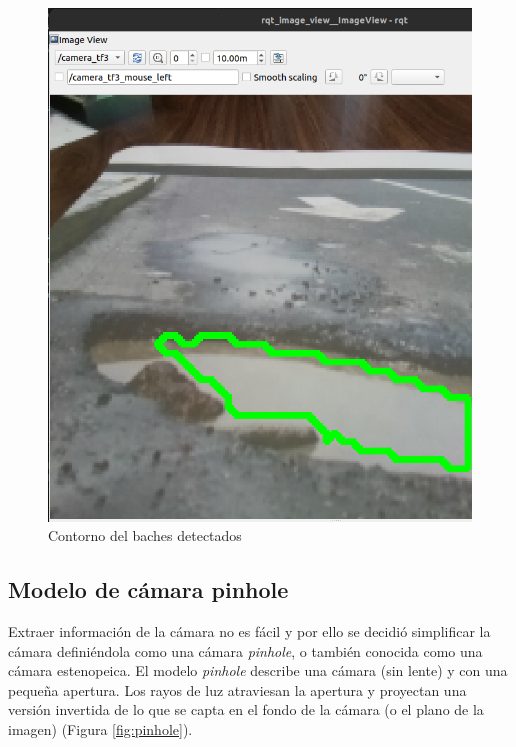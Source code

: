 \begin{figure}[ht!]
\begin{minipage}{0.4\linewidth}
		\includegraphics[width=\linewidth]{figs/cap6/contornobache2.png}
	\end{minipage}
	\caption{Contorno del baches detectados}
	\label{fig:contornobache}
\end{figure}

\subsection{Modelo de cámara pinhole}
\label{subsec:softwarehsuelo}

Extraer información de la cámara no es fácil y por ello se decidió simplificar la cámara definiéndola como una cámara \textit{pinhole}, o también conocida como una cámara estenopeica. El modelo \textit{pinhole} describe una cámara (sin lente) y con una pequeña apertura. Los rayos de luz atraviesan la apertura y proyectan una versión invertida de lo que se capta en el fondo de la cámara (o el plano de la imagen) (Figura \ref{fig:pinhole}).

